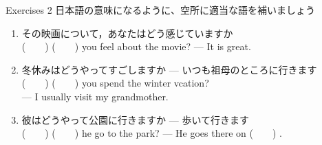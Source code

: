 \documentclass[aspectratio=169,xcolor={dvipsnames,table}]{beamer}
\begin{document}
\begin{frame}[plain]{Exercises 2}
 日本語の意味になるように、空所に適当な語を補いましょう
\begin{enumerate}
 \item その映画について，あなたはどう感じていますか\\
       (~~~~)  (~~~~)  you feel about the movie? --- It is great.
 \item 冬休みはどうやってすごしますか --- いつも祖母のところに行きます\\
       (~~~~)  (~~~~)  you spend the winter vcation?\\
 --- I usually visit my grandmother. \item 彼はどうやって公園に行きますか --- 歩いて行きます\\
       (~~~~)  (~~~~)  he go to the park? --- He goes there on  (~~~~) .
\end{enumerate}

\mbox{}\hfill{}

\hfill{}

\end{frame}
\end{document}
